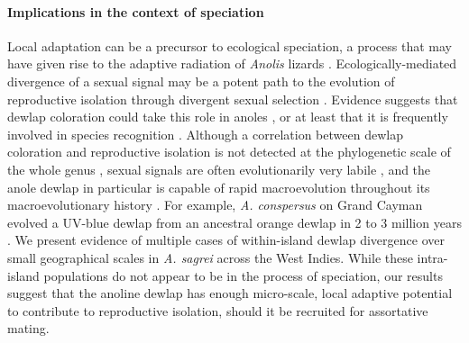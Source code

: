 \paragraph{Implications in the context of speciation} Local adaptation can be a precursor to ecological speciation, a process that may have given rise to the adaptive radiation of \textit{Anolis} lizards \citep{Harmon2003, Gavrilets2009}. Ecologically-mediated divergence of a sexual signal may be a potent path to the evolution of reproductive isolation through divergent sexual selection \citep{Reynolds2007, Servedio2011}. Evidence suggests that dewlap coloration could take this role in anoles \citep{Ng2011, Lambert2013, Geneva2015, Ng2017}, or at least that it is frequently involved in species recognition \citep{Williams1969, Williams1977, Losos1985, Macedonia1994, Fleishman2000, Macedonia2013, Ingram2016, Baeckens2018}. Although a correlation between dewlap coloration and reproductive isolation is not detected at the phylogenetic scale of the whole genus \citep{Nicholson2007, Harrison2012, Ingram2016}, sexual signals are often evolutionarily very labile \citep{Kraaijeveld2011}, and the anole dewlap in particular is capable of rapid macroevolution throughout its macroevolutionary history \citep{Nicholson2007}. For example, \textit{A. conspersus} on Grand Cayman evolved a UV-blue dewlap from an ancestral orange dewlap in 2 to 3 million years \citep{Macedonia2001}. We present evidence of multiple cases of within-island dewlap divergence over small geographical scales in \textit{A. sagrei} across the West Indies. While these intra-island populations do not appear to be in the process of speciation, our results suggest that the anoline dewlap has enough micro-scale, local adaptive potential to contribute to reproductive isolation, should it be recruited for assortative mating.